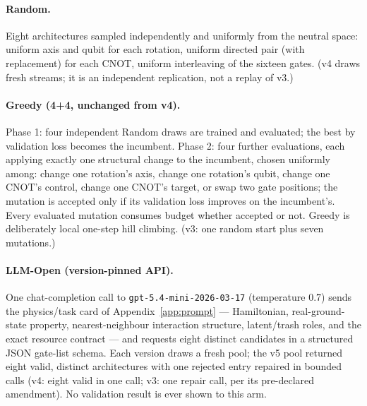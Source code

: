 \documentclass[11pt]{article}
\begin{document}
\paragraph{Random.}
Eight architectures sampled independently and uniformly from the neutral space: uniform axis and qubit for each rotation, uniform directed pair (with replacement) for each CNOT, uniform interleaving of the sixteen gates.
(v4 draws fresh streams; it is an independent replication, not a replay of v3.)

\paragraph{Greedy (4+4, unchanged from v4).}
Phase 1: four independent Random draws are trained and evaluated; the best by validation loss becomes the incumbent.
Phase 2: four further evaluations, each applying exactly one structural change to the incumbent, chosen uniformly among: change one rotation's axis, change one rotation's qubit, change one CNOT's control, change one CNOT's target, or swap two gate positions; the mutation is accepted only if its validation loss improves on the incumbent's.
Every evaluated mutation consumes budget whether accepted or not.
Greedy is deliberately local one-step hill climbing.
(v3: one random start plus seven mutations.)

\paragraph{LLM-Open (version-pinned API).}
One chat-completion call to \texttt{gpt-5.4-mini-2026-03-17} (temperature $0.7$) sends the physics/task card of Appendix~\ref{app:prompt} --- Hamiltonian, real-ground-state property, nearest-neighbour interaction structure, latent/trash roles, and the exact resource contract --- and requests eight distinct candidates in a structured JSON gate-list schema.
Each version draws a fresh pool; the v5 pool returned eight valid, distinct architectures with one rejected entry repaired in bounded calls (v4: eight valid in one call; v3: one repair call, per its pre-declared amendment).
No validation result is ever shown to this arm.
\end{document}
